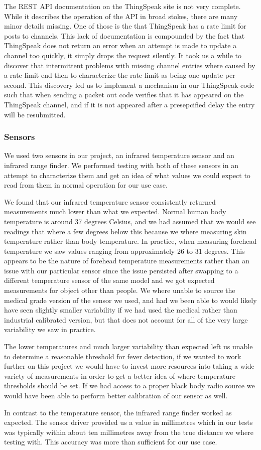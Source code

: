 The REST API documentation on the ThingSpeak site is not very complete. While it
describes the operation of the API in broad stokes, there are many minor details
missing. One of those is the that ThingSpeak has a rate limit for posts to
channels. This lack of documentation is compounded by the fact that ThingSpeak
does not return an error when an attempt is made to update a channel too
quickly, it simply drops the request silently. It took us a while to discover
that intermittent problems with missing channel entries where caused by a rate
limit end then to characterize the rate limit as being one update per second.
This discovery led us to implement a mechanism in our ThingSpeak code such that
when sending a packet out code verifies that it has appeared on the ThingSpeak
channel, and if it is not appeared after a presepcified delay the entry will
be resubmitted.

\subsubsection{Sensors}

We used two sensors in our project, an infrared temperature sensor and an
infrared range finder. We performed testing with both of these sensors in an
attempt to characterize them and get an idea of what values we could expect to
read from them in normal operation for our use case.

We found that our infrared temperature sensor consistently returned measurements
much lower than what we expected. Normal human body temperature is around 37
degrees Celsius, and we had assumed that we would see readings that where a few
degrees below this because we where measuring skin temperature rather than
body temperature. In practice, when measuring forehead temperature we saw values
ranging from approximately 26 to 31 degrees. This appears to be the nature of
forehead temperature measurements rather than an issue with our particular sensor
since the issue persisted after swapping to a different temperature sensor of the
same model and we got expected measurements for object other than people. We
where unable to source the medical grade version of the sensor we used, and had
we been able to would likely have seen slightly smaller variability if we had
used the medical rather than industrial calibrated version, but that does not
account for all of the very large variability we saw in practice.


The lower temperatures and much larger variability than expected left us unable
to determine a reasonable threshold for fever detection, if we wanted to work
further on this project we would have to invest more resources into taking a
wide variety of measurements in order to get a better idea of where temperature
thresholds should be set. If we had access to a proper black body radio source
we would have been able to perform better calibration of our sensor as well.

In contrast to the temperature sensor, the infrared range finder worked as
expected. The sensor driver provided us a value in millimetres which in our
tests was typically within about ten millimetres away from the true distance we
where testing with. This accuracy was more than sufficient for our use case.


